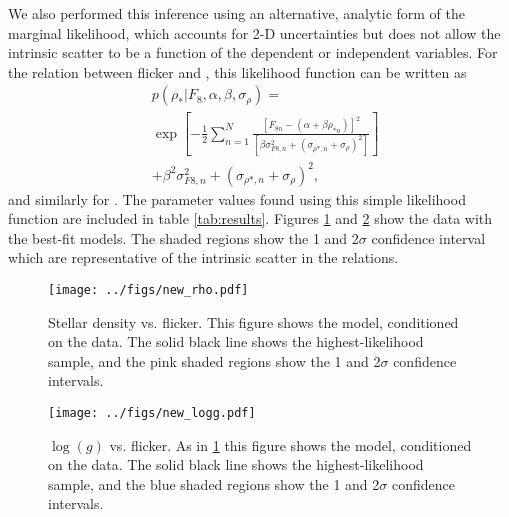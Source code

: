 We also performed this inference using an alternative, analytic form of the
marginal likelihood, which accounts for 2-D uncertainties but does not allow
the intrinsic scatter to be a function of the dependent or independent
variables.
For the relation between flicker and \rhostar, this likelihood function can be
written as
\begin{eqnarray}
	& p(\rho_*| F_8, \alpha, \beta, \sigma_{\rho}) =  \\ \nonumber
						      & \exp \left[-\frac{1}{2}
		\sum_{n=1}^N \frac{[F_{8n}-(\alpha + \beta \rho_{*n})]^2}
	{\left[\beta \sigma_{F8, n}^2 + (\sigma_{\rho *, n}
	+ \sigma_{\rho})^2\right]}\right]
	\\ \nonumber
	& + \beta^2 \sigma_{F8, n}^2 + (\sigma_{\rho *, n} + \sigma_{\rho})^2,
\end{eqnarray}
\label{eq:likelihood}
and similarly for \logg.
The parameter values found using this simple likelihood function are included
in table \ref{tab:results}.
Figures \ref{fig:rhostar} and \ref{fig:logg} show the data with the best-fit
models.
The shaded regions show the 1 and 2$\sigma$ confidence interval which are
representative of the intrinsic scatter in the relations.

\begin{figure}
\begin{center}
\texttt{[image: ../figs/new\_rho.pdf]}
\caption{
Stellar density vs. flicker.
This figure shows the model, conditioned on the data.
The solid black line shows the highest-likelihood sample, and the pink shaded
regions show the 1 and 2$\sigma$ confidence intervals.}
\label{fig:rhostar}
\end{center}
\end{figure}

\begin{figure}
\begin{center}
\texttt{[image: ../figs/new\_logg.pdf]}
\caption{
$\log(g)$ vs. flicker.
As in \ref{fig:rhostar} this figure shows the model, conditioned on the data.
The solid black line shows the highest-likelihood sample, and the blue shaded
regions show the 1 and 2$\sigma$ confidence intervals.}
\label{fig:logg}
\end{center}
\end{figure}

